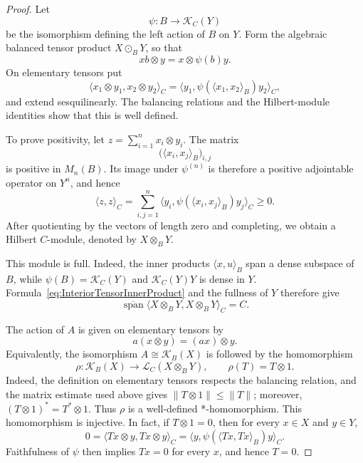 \documentclass{book}
\begin{document}
\begin{proof}
  Let
  \[
    \psi:B\longrightarrow\mathcal K_C(Y)
  \]
  be the isomorphism defining the left action of \(B\) on \(Y\). Form the
  algebraic balanced tensor product \(X\odot_B Y\), so that
  \[
    xb\otimes y=x\otimes\psi(b)y.
  \]
  On elementary tensors put
  \begin{equation}\label{eq:InteriorTensorInnerProduct}
    \langle x_1\otimes y_1,x_2\otimes y_2\rangle_C
    =
    \langle y_1,\psi(\langle x_1,x_2\rangle_B)y_2\rangle_C,
  \end{equation}
  and extend sesquilinearly. The balancing relations and the Hilbert-module
  identities show that this is well defined.

  To prove positivity, let \(z=\sum_{i=1}^n x_i\otimes y_i\). The matrix
  \[
    \big(\langle x_i,x_j\rangle_B\big)_{i,j}
  \]
  is positive in \(M_n(B)\). Its image under \(\psi^{(n)}\) is therefore a
  positive adjointable operator on \(Y^n\), and hence
  \[
    \langle z,z\rangle_C
    =
    \sum_{i,j=1}^n
    \langle y_i,\psi(\langle x_i,x_j\rangle_B)y_j\rangle_C
    \geq0.
  \]
  After quotienting by the vectors of length zero and completing, we obtain a
  Hilbert \(C\)-module, denoted by \(X\otimes_B Y\).

  This module is full. Indeed, the inner products \(\langle x,u\rangle_B\)
  span a dense subspace of \(B\), while
  \(\psi(B)=\mathcal K_C(Y)\) and \(\mathcal K_C(Y)Y\) is dense in \(Y\).
  Formula~\eqref{eq:InteriorTensorInnerProduct} and the fullness of \(Y\)
  therefore give
  \[
    \overline{\operatorname{span}}
    \langle X\otimes_B Y,X\otimes_B Y\rangle_C=C.
  \]

  The action of \(A\) is given on elementary tensors by
  \[
    a(x\otimes y)=(ax)\otimes y.
  \]
  Equivalently, the isomorphism
  \(A\cong\mathcal K_B(X)\) is followed by the homomorphism
  \[
    \rho:\mathcal K_B(X)\longrightarrow
    \mathcal L_C(X\otimes_B Y),
    \qquad
    \rho(T)=T\otimes1.
  \]
  Indeed, the definition on elementary tensors respects the balancing
  relation, and the matrix estimate used above gives
  \(\|T\otimes1\|\leq\|T\|\); moreover,
  \((T\otimes1)^*=T^*\otimes1\). Thus \(\rho\) is a well-defined
  *-homomorphism.
  This homomorphism is injective. In fact, if \(T\otimes1=0\), then for every
  \(x\in X\) and \(y\in Y\),
  \[
    0
    =\langle Tx\otimes y,Tx\otimes y\rangle_C
    =\langle y,\psi(\langle Tx,Tx\rangle_B)y\rangle_C.
  \]
  Faithfulness of \(\psi\) then implies \(Tx=0\) for every \(x\), and hence
  \(T=0\).


\end{proof}
\end{document}
